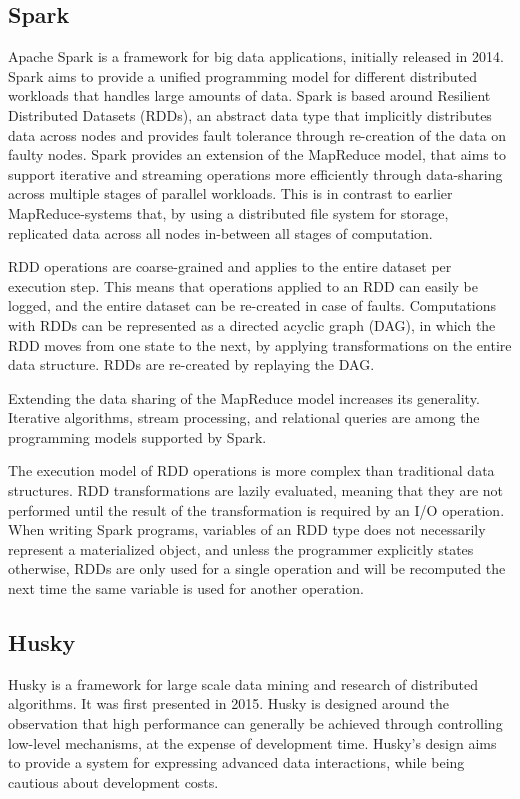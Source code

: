 \documentclass{uit-report}
\begin{document}
\subsection{Spark}
Apache Spark \cite{spark} is a framework for big data applications, initially released in 2014. Spark aims to provide a unified programming model for different distributed workloads that handles large amounts of data. Spark is based around Resilient Distributed Datasets (RDDs), an abstract data type that implicitly distributes data across nodes and provides fault tolerance through re-creation of the data on faulty nodes. Spark provides an extension of the MapReduce model, that aims to support iterative and streaming operations more efficiently through data-sharing across multiple stages of parallel workloads. This is in contrast to earlier MapReduce-systems that, by using a distributed file system for storage, replicated data across all nodes in-between all stages of computation.

RDD operations are coarse-grained and applies to the entire dataset per execution step. This means that operations applied to an RDD can easily be logged, and the entire dataset can be re-created in case of faults. Computations with RDDs can be represented as a directed acyclic graph (DAG), in which the RDD moves from one state to the next, by applying transformations on the entire data structure. RDDs are re-created by replaying the DAG.

Extending the data sharing of the MapReduce model increases its generality. Iterative algorithms, stream processing, and relational queries are among the programming models supported by Spark.

The execution model of RDD operations is more complex than traditional data structures. RDD transformations are lazily evaluated, meaning that they are not performed until the result of the transformation is required by an I/O operation. When writing Spark programs, variables of an RDD type does not necessarily represent a materialized object, and unless the programmer explicitly states otherwise, RDDs are only used for a single operation and will be recomputed the next time the same variable is used for another operation.

\subsection{Husky}
Husky \cite{husky}\cite{husky_website} is a framework for large scale data mining and research of distributed algorithms. It was first presented in 2015. Husky is designed around the observation that high performance can generally be achieved through controlling low-level mechanisms, at the expense of development time. Husky's design aims to provide a system for expressing advanced data interactions, while being cautious about development costs.
\end{document}

